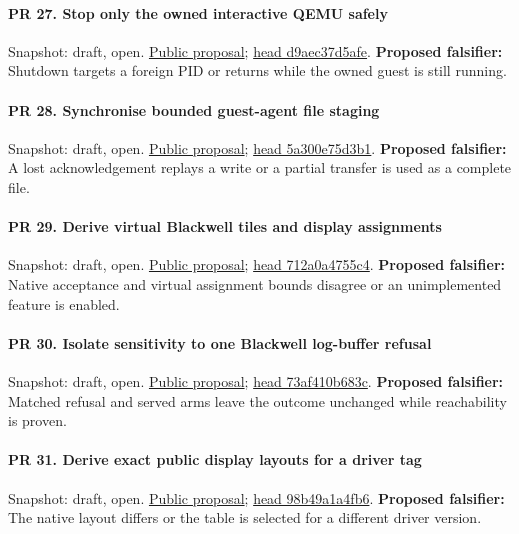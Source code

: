 \paragraph{PR 27. Stop only the owned interactive QEMU safely}
\readcode Snapshot: draft, open.
\href{\repobase/pull/27}{Public proposal};
\href{\repobase/commit/d9aec37d5afe4f208f79945909a5aefc159ca14d}{head d9aec37d5afe}.
\textbf{Proposed falsifier:} Shutdown targets a foreign PID or returns while the owned guest is
  still running.

\paragraph{PR 28. Synchronise bounded guest-agent file staging}
\readcode Snapshot: draft, open.
\href{\repobase/pull/28}{Public proposal};
\href{\repobase/commit/5a300e75d3b1b99fa17b8d4f07a5eea136f4118f}{head 5a300e75d3b1}.
\textbf{Proposed falsifier:} A lost acknowledgement replays a write or a partial transfer is used as
  a complete file.

\paragraph{PR 29. Derive virtual Blackwell tiles and display assignments}
\readcode Snapshot: draft, open.
\href{\repobase/pull/29}{Public proposal};
\href{\repobase/commit/712a0a4755c48fa40eec72724da7d9a09927845f}{head 712a0a4755c4}.
\textbf{Proposed falsifier:} Native acceptance and virtual assignment bounds disagree or an
  unimplemented feature is enabled.

\paragraph{PR 30. Isolate sensitivity to one Blackwell log-buffer refusal}
\readcode Snapshot: draft, open.
\href{\repobase/pull/30}{Public proposal};
\href{\repobase/commit/73af410b683c48b5419651073fb41867f4b21312}{head 73af410b683c}.
\textbf{Proposed falsifier:} Matched refusal and served arms leave the outcome unchanged while
  reachability is proven.

\paragraph{PR 31. Derive exact public display layouts for a driver tag}
\readcode Snapshot: draft, open.
\href{\repobase/pull/31}{Public proposal};
\href{\repobase/commit/98b49a1a4fb6f13bd8bad8214f63039dffa81d42}{head 98b49a1a4fb6}.
\textbf{Proposed falsifier:} The native layout differs or the table is selected for a different
  driver version.

